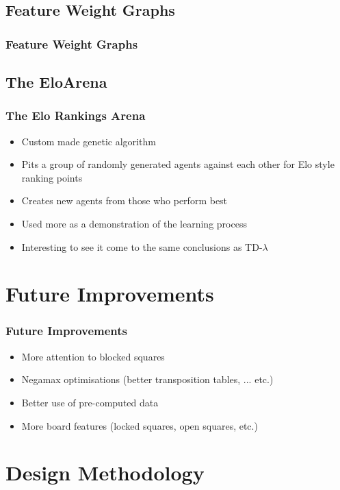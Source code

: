 \documentclass[10pt]{beamer}
\begin{document}
\subsection{Feature Weight Graphs}

\begin{frame}
  \frametitle{Feature Weight Graphs}
\end{frame}

\subsection{The EloArena}

\begin{frame}
  \frametitle{The Elo Rankings Arena}
  \begin{itemize}
  \item<1-> Custom made genetic algorithm
  \item<1-> Pits a group of randomly generated agents against each other for Elo style ranking points
  \item<1-> Creates new agents from those who perform best
  \item<2-> Used more as a demonstration of the learning process
  \item<2-> Interesting to see it come to the same conclusions as TD-$\lambda$
  \end{itemize}
\end{frame}

\section{Future Improvements}

\begin{frame}
  \frametitle{Future Improvements}
  \begin{itemize}
  \item<1-> More attention to blocked squares
  \item<2-> Negamax optimisations (better transposition tables, ... etc.)
  \item<3-> Better use of pre-computed data
  \item<4-> More board features (locked squares, open squares, etc.)
  \end{itemize}
\end{frame}

\section{Design Methodology}
\end{document}
